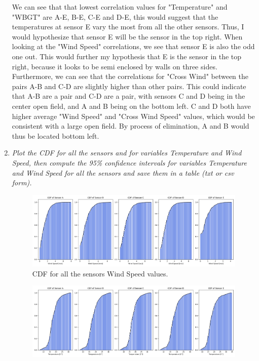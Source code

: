 \documentclass[a4paper,12pt]{article} %
\begin{document}
\begin{enumerate}
We can see that that lowest correlation values for "Temperature" and "WBGT" are A-E, B-E, C-E and D-E, this would suggest that the temperatures at sensor E vary the most from all the other sensors. Thus, I would hypothesize that sensor E will be the sensor in the top right. When looking at the "Wind Speed" correlations, we see that sensor E is also the odd one out. This would further my hypothesis that E is the sensor in the top right, because it looks to be semi enclosed by walls on three sides. 
\\Furthermore, we can see that the correlations for "Cross Wind" between the pairs A-B and C-D are slightly higher than other pairs. This could indicate that A-B are a pair and C-D are a pair, with sensors C and D being in the center open field, and A and B being on the bottom left. C and D both have higher average "Wind Speed" and "Cross Wind Speed" values, which would be consistent with a large open field. By process of elimination, A and B would thus be located bottom left. 
\newpage
\item{\it Plot the CDF for all the sensors and for variables Temperature and Wind Speed, then compute the 95\% confidence intervals for variables Temperature and Wind Speed for all the sensors and save them in a table (txt or csv form).}
\begin{figure}[H] %
    \centering %
    \includegraphics[width=1\textwidth]{plot_CDF_WS.png} 
    \caption{CDF for all the sensors Wind Speed values.} %
  \end{figure}
  \begin{figure}[H] %
    \centering %
    \includegraphics[width=1\textwidth]{plot_CDF_T.png} 

\end{figure}
\end{enumerate}
\end{document}
